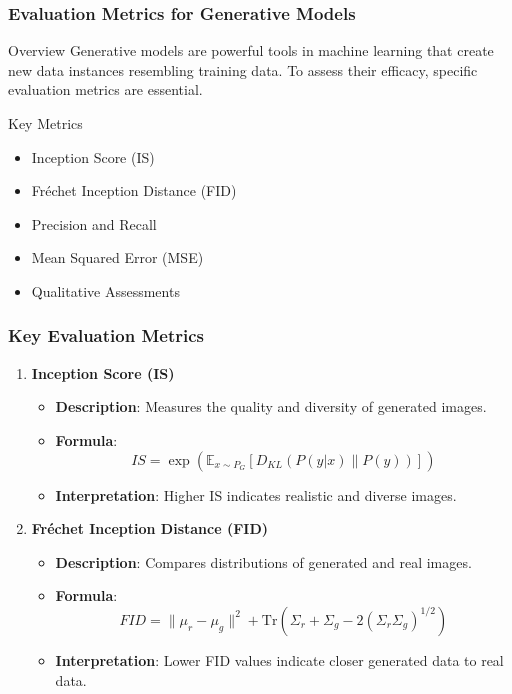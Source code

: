 \documentclass[aspectratio=169]{beamer}
\begin{document}
\begin{frame}[fragile]
    \frametitle{Evaluation Metrics for Generative Models}
    \begin{block}{Overview}
        Generative models are powerful tools in machine learning that create new data instances resembling training data. To assess their efficacy, specific evaluation metrics are essential.
    \end{block}
    \begin{block}{Key Metrics}
        \begin{itemize}
            \item Inception Score (IS)
            \item Fréchet Inception Distance (FID)
            \item Precision and Recall
            \item Mean Squared Error (MSE)
            \item Qualitative Assessments
        \end{itemize}
    \end{block}
\end{frame}

\begin{frame}[fragile]
    \frametitle{Key Evaluation Metrics}
    \begin{enumerate}
        \item \textbf{Inception Score (IS)}  
        \begin{itemize}
            \item \textbf{Description}: Measures the quality and diversity of generated images.
            \item \textbf{Formula}: 
            \begin{equation}
                IS = \exp\left(\mathbb{E}_{x \sim P_G} [D_{KL}(P(y|x) \| P(y))]\right)
            \end{equation}
            \item \textbf{Interpretation}: Higher IS indicates realistic and diverse images.
        \end{itemize}
        
        \item \textbf{Fréchet Inception Distance (FID)}  
        \begin{itemize}
            \item \textbf{Description}: Compares distributions of generated and real images.
            \item \textbf{Formula}:
            \begin{equation}
                FID = \| \mu_r - \mu_g \|^2 + \text{Tr}(\Sigma_r + \Sigma_g - 2(\Sigma_r \Sigma_g)^{1/2})
            \end{equation}
            \item \textbf{Interpretation}: Lower FID values indicate closer generated data to real data.
        \end{itemize}
    \end{enumerate}
\end{frame}
\end{document}
